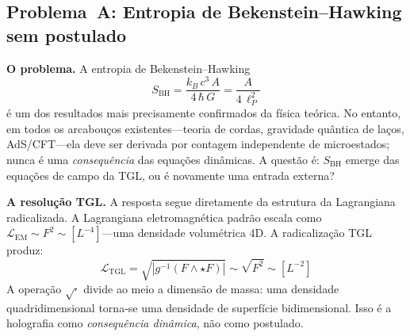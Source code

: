 \documentclass[12pt,a4paper,twocolumn]{article}
\begin{document}
\subsection{Problema~A: Entropia de Bekenstein--Hawking sem postulado}
\label{sec:problem_a}

\textbf{O problema.} A entropia de Bekenstein--Hawking
\begin{equation}
S_{\text{BH}} = \frac{k_B\,c^3\,A}{4\,\hbar\,G} = \frac{A}{4\,\ell_P^2}
\label{eq:BH}
\end{equation}
é um dos resultados mais precisamente confirmados da física teórica. No
entanto, em todos os arcabouços existentes---teoria de cordas, gravidade
quântica de laços, AdS/CFT---ela deve ser derivada por contagem independente
de microestados; nunca é uma \emph{consequência} das equações dinâmicas. A
questão é: $S_{\text{BH}}$ emerge das equações de campo da TGL, ou é
novamente uma entrada externa?

\textbf{A resolução TGL.} A resposta segue diretamente da estrutura da
Lagrangiana radicalizada. A Lagrangiana eletromagnética padrão escala como
$\mathcal{L}_{\text{EM}} \sim F^2 \sim [L^{-4}]$---uma densidade volumétrica 4D. A
radicalização TGL produz:
\begin{equation}
\mathcal{L}_{\text{TGL}} = \sqrt{|g^{-1}(F \wedge \star F)|} \sim \sqrt{F^2}
\sim [L^{-2}]
\end{equation}
A operação $\sqrt{\cdot}$ divide ao meio a dimensão de massa: uma densidade
quadridimensional torna-se uma densidade de superfície bidimensional. Isso é
a holografia como \emph{consequência dinâmica}, não como postulado.
\end{document}
